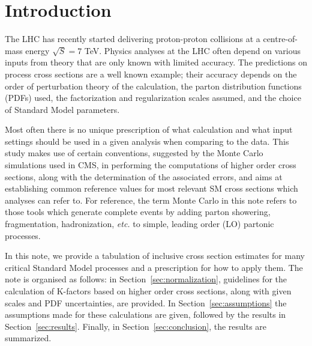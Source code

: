 \section{Introduction}
\label{sec:intro}
The LHC has recently started delivering proton-proton collisions at a 
centre-of-mass energy $\sqrt{S}=7$ TeV. 
Physics analyses at the LHC often depend 
on various inputs from theory that are only known with limited accuracy. The 
predictions on process cross sections are a well known example; their 
accuracy depends on the order of perturbation theory of the calculation, the
parton distribution functions (PDFs) used, the factorization and regularization scales assumed, and the choice of Standard Model parameters.

Most often there is no unique prescription of what calculation and what input 
settings should be used in a given analysis when comparing to the data. 
This study makes use of certain conventions, suggested by the 
Monte Carlo simulations used in CMS, in performing the computations of
higher order cross sections, along with the determination of the associated
errors, and aims at establishing common reference values for most relevant
SM cross sections which analyses can refer to.
For reference, the term Monte Carlo in this note refers to those tools which generate complete events by adding parton showering, fragmentation, hadronization, {\it etc.} to simple, leading order (LO) partonic processes.

In this note, we provide a tabulation of inclusive cross section estimates for
many critical Standard Model processes and a prescription for how to apply them.
The note is organised as follows:
in Section~\ref{sec:normalization}, guidelines for the calculation of K-factors 
based on higher order cross sections, along with given scales and PDF 
uncertainties, are provided. In Section~\ref{sec:assumptions} the assumptions 
made for these calculations are given, followed by the results in 
Section~\ref{sec:results}. Finally, in Section~\ref{sec:conclusion}, the 
results are summarized.
